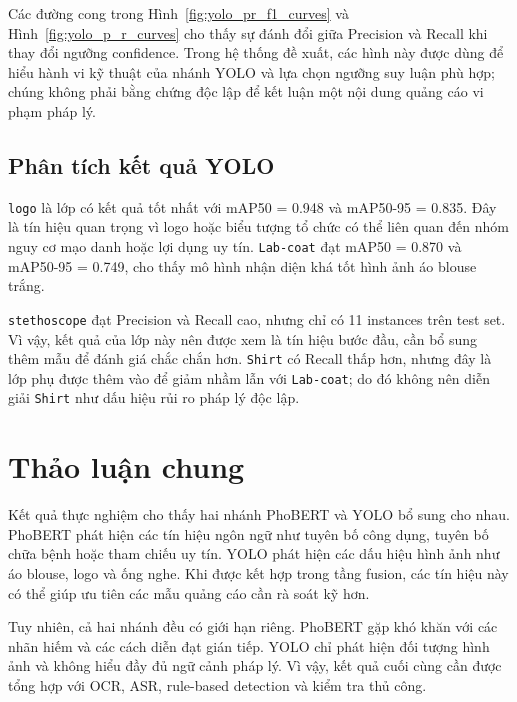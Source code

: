 Các đường cong trong Hình~\ref{fig:yolo_pr_f1_curves} và Hình~\ref{fig:yolo_p_r_curves} cho thấy sự đánh đổi giữa Precision và Recall khi thay đổi ngưỡng confidence. Trong hệ thống đề xuất, các hình này được dùng để hiểu hành vi kỹ thuật của nhánh YOLO và lựa chọn ngưỡng suy luận phù hợp; chúng không phải bằng chứng độc lập để kết luận một nội dung quảng cáo vi phạm pháp lý.

\subsection{Phân tích kết quả YOLO}
\texttt{logo} là lớp có kết quả tốt nhất với mAP50 = 0.948 và mAP50-95 = 0.835. Đây là tín hiệu quan trọng vì logo hoặc biểu tượng tổ chức có thể liên quan đến nhóm nguy cơ mạo danh hoặc lợi dụng uy tín. \texttt{Lab-coat} đạt mAP50 = 0.870 và mAP50-95 = 0.749, cho thấy mô hình nhận diện khá tốt hình ảnh áo blouse trắng.

\texttt{stethoscope} đạt Precision và Recall cao, nhưng chỉ có 11 instances trên test set. Vì vậy, kết quả của lớp này nên được xem là tín hiệu bước đầu, cần bổ sung thêm mẫu để đánh giá chắc chắn hơn. \texttt{Shirt} có Recall thấp hơn, nhưng đây là lớp phụ được thêm vào để giảm nhầm lẫn với \texttt{Lab-coat}; do đó không nên diễn giải \texttt{Shirt} như dấu hiệu rủi ro pháp lý độc lập.

\section{Thảo luận chung}
Kết quả thực nghiệm cho thấy hai nhánh PhoBERT và YOLO bổ sung cho nhau. PhoBERT phát hiện các tín hiệu ngôn ngữ như tuyên bố công dụng, tuyên bố chữa bệnh hoặc tham chiếu uy tín. YOLO phát hiện các dấu hiệu hình ảnh như áo blouse, logo và ống nghe. Khi được kết hợp trong tầng fusion, các tín hiệu này có thể giúp ưu tiên các mẫu quảng cáo cần rà soát kỹ hơn.

Tuy nhiên, cả hai nhánh đều có giới hạn riêng. PhoBERT gặp khó khăn với các nhãn hiếm và các cách diễn đạt gián tiếp. YOLO chỉ phát hiện đối tượng hình ảnh và không hiểu đầy đủ ngữ cảnh pháp lý. Vì vậy, kết quả cuối cùng cần được tổng hợp với OCR, ASR, rule-based detection và kiểm tra thủ công.

